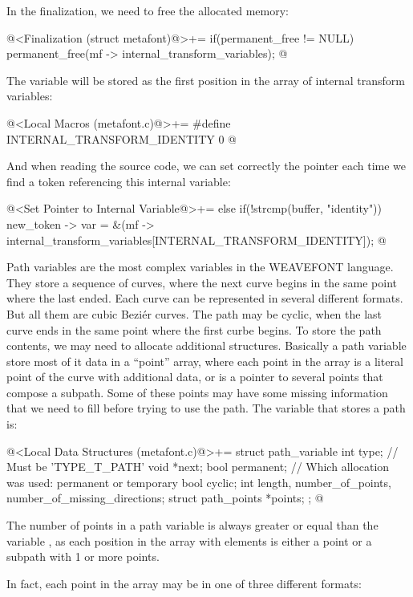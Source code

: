 In the finalization, we need to free the allocated memory:

\iniciocodigo
@<Finalization (struct metafont)@>+=
if(permanent_free != NULL)
  permanent_free(mf -> internal_transform_variables);
@
\fimcodigo

The variable  will be stored as the first
position in the array of internal transform variables:

\iniciocodigo
@<Local Macros (metafont.c)@>+=
#define INTERNAL_TRANSFORM_IDENTITY 0
@
\fimcodigo

And when reading the source code, we can set correctly the pointer
each time we find a token referencing this internal variable:

\iniciocodigo
@<Set Pointer to Internal Variable@>+=
else if(!strcmp(buffer, "identity"))
  new_token -> var =
          &(mf -> internal_transform_variables[INTERNAL_TRANSFORM_IDENTITY]);
@
\fimcodigo



Path variables are the most complex variables in the WEAVEFONT
language. They store a sequence of curves, where the next curve begins
in the same point where the last ended. Each curve can be represented
in several different formats. But all them are cubic Beziér
curves. The path may be cyclic, when the last curve ends in the same
point where the first curbe begins. To store the path contents, we may
need to allocate additional structures. Basically a path variable
store most of it data in a ``point'' array, where each point in the
array is a literal point of the curve with additional data, or is a
pointer to several points that compose a subpath. Some of these points
may have some missing information that we need to fill before trying
to use the path. The variable that stores a path is:

\iniciocodigo
@<Local Data Structures (metafont.c)@>+=
struct path_variable{
  int type; // Must be 'TYPE_T_PATH'
  void *next;
  bool permanent; // Which allocation was used: permanent or temporary
  bool cyclic;
  int length, number_of_points, number_of_missing_directions;
  struct path_points *points;
};
@
\fimcodigo

The number of points in a path variable is always greater or equal
than the variable , as each position in the array
with  elements is either a point or a subpath with
1 or more points.

In fact, each point in the array may be in one of three different
formats:

